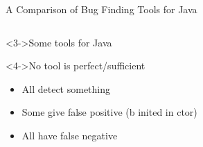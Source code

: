 \begin{frame}{A Comparison of Bug Finding Tools for Java}
\begin{columns}
\begin{column}{.55\linewidth}
      \begin{block}<3->{Some tools for Java}\medskip
      \end{block}\vspace{-.2\baselineskip}

      \begin{block}<4->{No tool is perfect/sufficient}
        \begin{itemize}\vspace{-.4\baselineskip}
        \item All detect something
        \item Some give false positive {\small(b inited in ctor)}
        \item All have false negative
        \end{itemize}
      \end{block}
    \end{column}
  \end{columns}
\end{frame}
